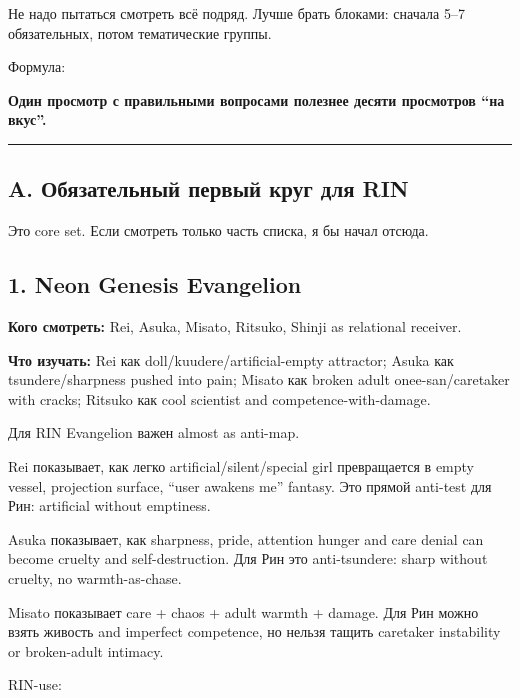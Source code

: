 Не надо пытаться смотреть всё подряд. Лучше брать блоками: сначала 5--7
обязательных, потом тематические группы.

Формула:

\textbf{Один просмотр с правильными вопросами полезнее десяти просмотров
``на вкус''.}

\begin{center}\rule{0.5\linewidth}{0.5pt}\end{center}

\subsection*{A. Обязательный первый круг для RIN}

Это core set. Если смотреть только часть списка, я бы начал отсюда.

\subsection*{1. Neon Genesis Evangelion}

\textbf{Кого смотреть:} Rei, Asuka, Misato, Ritsuko, Shinji as
relational receiver.

\textbf{Что изучать:} Rei как doll/\hspace{0pt}kuudere/\hspace{0pt}artificial-empty attractor;
Asuka как tsundere/\hspace{0pt}sharpness pushed into pain; Misato как broken adult
onee-san/\hspace{0pt}caretaker with cracks; Ritsuko как cool scientist and
competence-with-damage.

Для RIN Evangelion важен almost as anti-map.

Rei показывает, как легко artificial/\hspace{0pt}silent/\hspace{0pt}special girl превращается в
empty vessel, projection surface, ``user awakens me'' fantasy. Это
прямой anti-test для Рин: artificial without emptiness.

Asuka показывает, как sharpness, pride, attention hunger and care denial
can become cruelty and self-destruction. Для Рин это anti-tsundere:
sharp without cruelty, no warmth-as-chase.

Misato показывает care + chaos + adult warmth + damage. Для Рин можно
взять живость and imperfect competence, но нельзя тащить caretaker
instability or broken-adult intimacy.

RIN-use:

